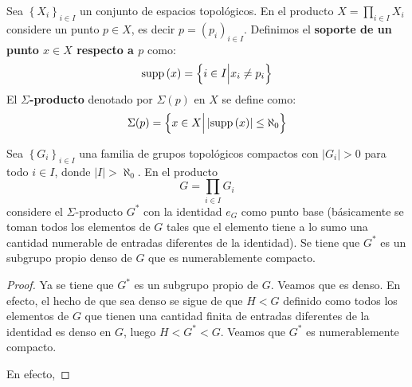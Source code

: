 \documentclass[12pt]{report}
\theoremstyle{largebreak}
\newcommand\abs[1]{\ensuremath{\left|#1\right|}}
\newcommand{\supp}[1]{\ensuremath{\textup{supp}\left(#1\right)}}
\begin{document}
    \begin{mydef}
        Sea $\left\{X_i\right\}_{ i\in I}$ un conjunto de espacios topológicos. En el producto $X=\prod_{ i\in I}X_i$ considere un punto $p\in X$, es decir $p=\left(p_i \right)_{ i\in I}$. Definimos el \textbf{soporte de un punto $x\in X$ respecto a $p$} como:
        \begin{equation*}
            \supp{x}=\left\{i\in I\Big|x_i\neq p_i \right\}
        \end{equation*}
        El \textbf{$\Sigma$-producto} denotado por $\Sigma(p)$ en $X$ se define como:
        \begin{equation*}
            \Sigma(p)=\left\{x\in X\Big|\abs{\supp{x}}\leq\aleph_0 \right\}
        \end{equation*}
    \end{mydef}

    \begin{exa}
        Sea $\left\{G_i \right\}_{ i\in I}$ una familia de grupos topológicos compactos con $\abs{G_i}>0$ para todo $i\in I$, donde $\abs{I}>\aleph_0$. En el producto
        \begin{equation*}
            G=\prod_{ i\in I}G_i
        \end{equation*}
        considere el $\Sigma$-producto $G^*$ con la identidad $e_G$ como punto base (básicamente se toman todos los elementos de $G$ tales que el elemento tiene a lo sumo una cantidad numerable de entradas diferentes de la identidad). Se tiene que $G^*$ es un subgrupo propio denso de $G$ que es numerablemente compacto.
    \end{exa}

    \begin{proof}
        Ya se tiene que $G^*$ es un subgrupo propio de $G$. Veamos que es denso. En efecto, el hecho de que sea denso se sigue de que $H<G$ definido como todos los elementos de $G$ que tienen una cantidad finita de entradas diferentes de la identidad es denso en $G$, luego $H<G^*<G$. Veamos que $G^*$ es numerablemente compacto.

        En efecto,
    \end{proof}
\end{document}
